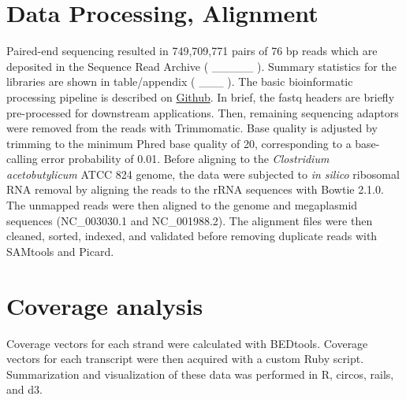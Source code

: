 \section{Data Processing, Alignment}
Paired-end sequencing resulted in 749,709,771 pairs of 76 bp reads which are deposited in the Sequence Read Archive ( _____ ). Summary statistics for the libraries are shown in table/appendix ( ___ ). The basic bioinformatic processing pipeline is described on \href{https://github.com/MatthewRalston/NGS_scripts}{Github}. In brief, the fastq headers are briefly pre-processed for downstream applications. Then, remaining sequencing adaptors were removed from the reads with Trimmomatic\cite{47}. Base quality is adjusted by trimming to the minimum Phred base quality of 20, corresponding to a base-calling error probability of 0.01. Before aligning to the \textit{Clostridium acetobutylicum} ATCC 824 genome, the data were subjected to \textit{in silico} ribosomal RNA removal by aligning the reads to the rRNA sequences with Bowtie 2.1.0\cite{17}. The unmapped reads were then aligned to the genome and megaplasmid sequences (NC_003030.1 and NC_001988.2). The alignment files were then cleaned, sorted, indexed, and validated before removing duplicate reads with SAMtools\cite{19} and Picard\cite{40}.

\section{Coverage analysis}
Coverage vectors for each strand were calculated with BEDtools\cite{49}. Coverage vectors for each transcript were then acquired with a custom Ruby script. Summarization and visualization of these data was performed in R\cite{59}, circos, rails, and d3.


